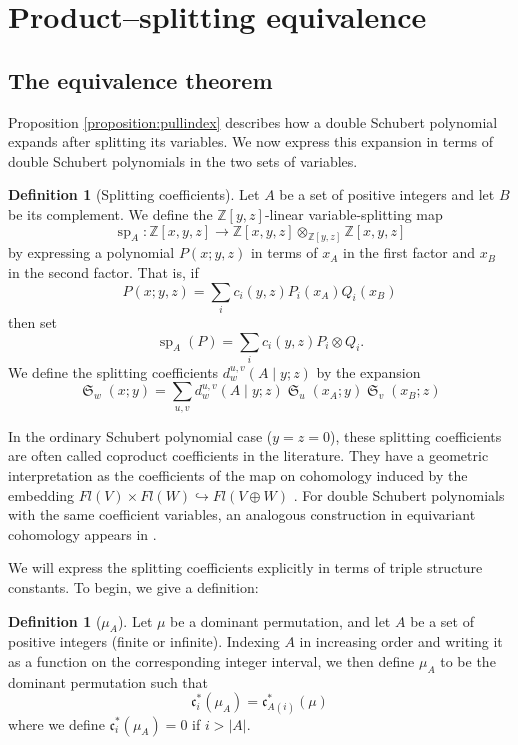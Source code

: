 \documentclass[reqno]{amsart}
\theoremstyle{definition}
\newtheorem{definition}[lemma]{Definition}
\theoremstyle{remark}
\numberwithin{equation}{subsection}
\DeclareMathOperator{\sch}{\mathfrak{S}}
\newcommand{\cpcf}[5]{d^{#1,#2}_{#3}\left(#4\mid #5\right)}
\newcommand{\code}{\mathfrak{c}}
\begin{document}
\section{Product--splitting equivalence} \label{section:coprod}

\subsection{The equivalence theorem}

Proposition \ref{proposition:pullindex} describes how a double Schubert polynomial expands after splitting its variables. We now express this expansion in terms of double Schubert polynomials in the two sets of variables.

\begin{definition}[Splitting coefficients] \label{definition:coprod}
Let $A$ be a set of positive integers and let $B$ be its complement. We define the $\mathbb{Z}[y,z]$-linear variable-splitting map
$$\operatorname{sp}_A:\mathbb{Z}[x,y,z]\to\mathbb{Z}[x,y,z]\otimes_{\mathbb{Z}[y,z]}\mathbb{Z}[x,y,z]$$
by expressing a polynomial $P(x;y,z)$ in terms of $x_A$ in the first factor and $x_B$ in the second factor. That is, if
$$P(x;y,z)=\sum_i c_i(y,z)P_i(x_A)Q_i(x_B)$$
then set
$$\operatorname{sp}_A(P)=\sum_i c_i(y,z)P_i\otimes Q_i.$$
We define the splitting coefficients $\cpcf{u}{v}{w}{A}{y;z}$ by the expansion
$$\sch_w(x;y)=\sum_{u,v} \cpcf{u}{v}{w}{A}{y;z}\sch_u(x_A;y)\sch_v(x_B;z)$$

In the ordinary Schubert polynomial case ($y=z=0$), these splitting coefficients are often called coproduct coefficients in the literature. They have a geometric interpretation as the coefficients of the map on cohomology induced by the embedding $Fl(V)\times Fl(W)\hookrightarrow Fl(V\oplus W)$ \cite{coprod}. For double Schubert polynomials with the same coefficient variables, an analogous construction in equivariant cohomology appears in \cite{anderson2023strong}.
\end{definition}

We will express the splitting coefficients explicitly in terms of triple structure constants. To begin, we give a definition:



\begin{definition}[$\mu_A$] \label{definition:mua}
Let $\mu$ be a dominant permutation, and let $A$ be a set of positive integers (finite or infinite). Indexing $A$ in increasing order and writing it as a function on the corresponding integer interval, we then define $\mu_A$ to be the dominant permutation such that
$$\code_i^*(\mu_A)=\code_{A(i)}^*(\mu)$$
where we define $\code_i^*(\mu_A)=0$ if $i>|A|$.
\end{definition}
\end{document}
